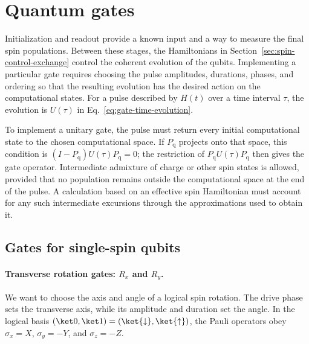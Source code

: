 \section{Quantum gates}
\label{sec:quantum-gates}
\label{sec:hamiltonians-to-gates}

Initialization and readout provide a known input and a way to
measure the final spin populations. Between these stages, the
Hamiltonians in Section~\ref{sec:spin-control-exchange} control the
coherent evolution of the qubits. Implementing a particular gate
requires choosing the pulse amplitudes, durations, phases, and
ordering so that the resulting evolution has the desired action
on the computational states. For a pulse described by $H(t)$ over
a time interval $\tau$, the evolution is $U(\tau)$ in
Eq.~\eqref{eq:gate-time-evolution}.

To implement a unitary gate, the pulse must return every initial
computational state to the chosen computational space. If
$P_{\mathrm q}$ projects onto that space, this condition is
$(I-P_{\mathrm q})U(\tau)P_{\mathrm q}=0$; the restriction of
$P_{\mathrm q}U(\tau)P_{\mathrm q}$ then gives the gate operator.
Intermediate admixture of charge or other spin states is allowed,
provided that no population remains outside the computational space
at the end of the pulse. A calculation based on an effective spin
Hamiltonian must account for any such intermediate excursions
through the approximations used to obtain it.

\subsection{Gates for single-spin qubits}
\label{sec:single-qubit-gates}

\paragraph{Transverse rotation gates: \texorpdfstring{$R_x$ and $R_y$}{Rx and Ry}.}
We want to choose the axis and angle of a logical spin rotation.
The drive phase sets the transverse axis, while its amplitude and
duration set the angle.
In the logical basis $(\ket0,\ket1)=(\ket{\downarrow},\ket{\uparrow})$,
the Pauli operators obey
$\sigma_x=X$, $\sigma_y=-Y$, and $\sigma_z=-Z$.

